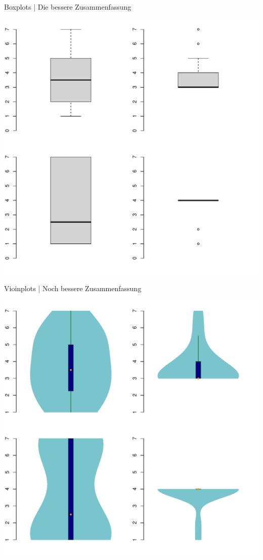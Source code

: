 \begin{frame}
  {Boxplots | Die bessere Zusammenfassung}
  \begin{center}
    \includegraphics[height=0.7\textheight]{RVorlesung/fourbox}
  \end{center}
\end{frame}


\begin{frame}
  {Vioinplots | Noch bessere Zusammenfassung}
  \begin{center}
    \includegraphics[height=0.7\textheight]{RVorlesung/fourviolins}
  \end{center}
\end{frame}

